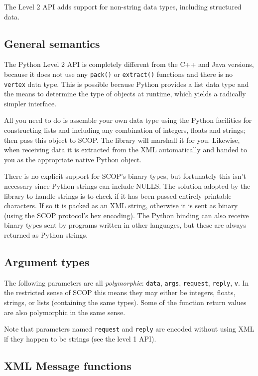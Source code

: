 \documentclass[12pt,a4paper,twoside]{article}
\renewcommand{\_}{\texttt{\symbol{95}}}
\begin{document}
The Level 2 API adds support for non-string data types, including
structured data.

\subsection{General semantics}

The Python Level 2 API is completely different from the C++ and Java
versions, because it does not use any \texttt{pack()} or \texttt{extract()}
functions and there is no \texttt{vertex} data type. This is possible
because Python provides a list data type and the means to determine
the type of objects at runtime, which yields a radically simpler interface.

All you need to do is assemble your own data type using the Python
facilities for constructing lists and including any combination
of integers, floats and strings; then pass this object to SCOP.
The library will marshall it for you. Likewise, when receiving data
it is extracted from the XML automatically and handed to you
as the appropriate native Python object.

There is no explicit support for SCOP's binary types, but fortunately
this isn't necessary since Python strings can include NULLS. The
solution adopted by the library to handle strings is to check if it has
been passed entirely printable characters. If so it is packed as
an XML string, otherwise it is sent as binary (using the SCOP
protocol's hex encoding). The Python binding can also receive binary
types sent by programs written in other languages, but these are always
returned as Python strings.

\subsection{Argument types}

The following parameters are all \textit{polymorphic}:
\texttt{data},
\texttt{args},
\texttt{request},
\texttt{reply},
\texttt{v}.
In the restricted sense of SCOP this means they may either be
integers, floats, strings, or lists (containing the same types).
Some of the function return values are also polymorphic in the same sense.

Note that parameters named \texttt{request} and \texttt{reply} are
encoded without using XML if they happen to be strings (see the level 1
API).

\subsection{XML Message functions}
\end{document}
